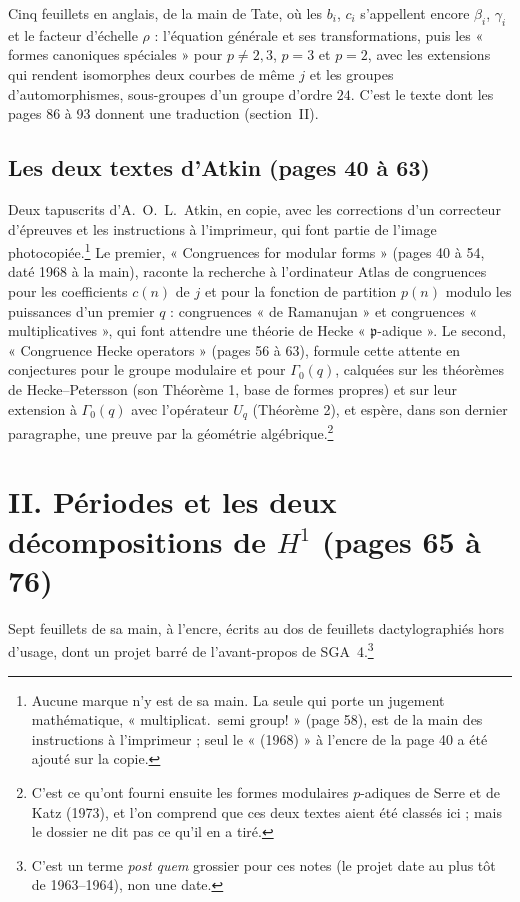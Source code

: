 \documentclass[11pt,a4paper]{article}
\begin{document}
Cinq feuillets en anglais, de la main de Tate, où les $b_i$, $c_i$ s'appellent
encore $\beta_i$, $\gamma_i$ et le facteur d'échelle $\rho$ : l'équation
générale et ses transformations, puis les « formes canoniques spéciales » pour
$p \neq 2,3$, $p = 3$ et $p = 2$, avec les extensions qui rendent isomorphes
deux courbes de même $j$ et les groupes d'automorphismes, sous-groupes d'un
groupe d'ordre $24$. C'est le texte dont les pages 86 à 93 donnent une
traduction (section~II).

\subsection*{Les deux textes d'Atkin (pages 40 à 63)}

Deux tapuscrits d'A.~O.~L.~Atkin, en copie, avec les corrections d'un
correcteur d'épreuves et les instructions à l'imprimeur, qui font partie de
l'image photocopiée.\footnote{Aucune marque n'y est de sa main. La seule qui
porte un jugement mathématique, « multiplicat.\ semi group! » (page 58), est de
la main des instructions à l'imprimeur ; seul le « (1968) » à l'encre de la
page 40 a été ajouté sur la copie.} Le premier, « Congruences for modular
forms » (pages 40 à 54, daté 1968 à la main), raconte la recherche à
l'ordinateur Atlas de congruences pour les coefficients $c(n)$ de $j$ et pour
la fonction de partition $p(n)$ modulo les puissances d'un premier $q$ :
congruences « de Ramanujan » et congruences « multiplicatives », qui font
attendre une théorie de Hecke « $\mathfrak{p}$-adique ». Le second, « Congruence
Hecke operators » (pages 56 à 63), formule cette attente en conjectures pour le
groupe modulaire et pour $\Gamma_0(q)$, calquées sur les théorèmes de
Hecke--Petersson (son Théorème 1, base de formes propres) et sur leur
extension à $\Gamma_0(q)$ avec l'opérateur $U_q$ (Théorème 2), et espère, dans son dernier paragraphe,
une preuve par la géométrie algébrique.\footnote{C'est ce qu'ont fourni
ensuite les formes modulaires $p$-adiques de Serre et de Katz (1973), et l'on
comprend que ces deux textes aient été classés ici ; mais le dossier ne dit pas
ce qu'il en a tiré.}

\section*{II. Périodes et les deux décompositions de $H^1$ (pages 65 à 76)}

Sept feuillets de sa main, à l'encre, écrits au dos de feuillets
dactylographiés hors d'usage, dont un projet barré de l'avant-propos de
SGA~4.\footnote{C'est un terme \emph{post quem} grossier pour ces notes (le
projet date au plus tôt de 1963--1964), non une date.}
\end{document}
